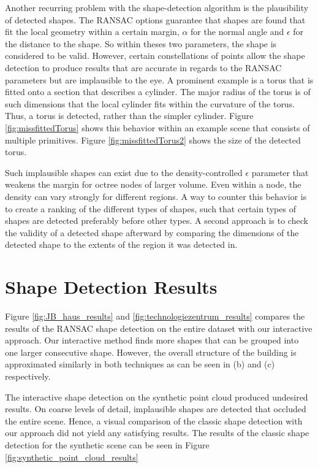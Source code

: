 Another recurring problem with the shape-detection algorithm is the plausibility of detected shapes. The RANSAC options guarantee that shapes are found that fit the local geometry within a certain margin, $\alpha$ for the normal angle and $\epsilon$ for the distance to the shape. So within theses two parameters, the shape is considered to be valid. However, certain constellations of points allow the shape detection to produce results that are accurate in regards to the RANSAC parameters but are implausible to the eye. A prominent example is a torus that is fitted onto a section that describes a cylinder. The major radius of the torus is of such dimensions that the local cylinder fits within the curvature of the torus. Thus, a torus is detected, rather than the simpler cylinder. Figure \ref{fig:missfittedTorus} shows this behavior within an example scene that consists of multiple primitives. Figure \ref{fig:missfittedTorus2} shows the size of the detected torus. 

\par

Such implausible shapes can exist due to the density-controlled $\epsilon$ parameter that weakens the margin for octree nodes of larger volume. Even within a node, the density can vary strongly for different regions. A way to counter this behavior is to create a ranking of the different types of shapes, such that certain types of shapes are detected preferably before other types. A second approach is to check the validity of a detected shape afterward by comparing the dimensions of the detected shape to the extents of the region it was detected in. 


\section{Shape Detection Results}
\label{sec:shape_detection_results}

Figure \ref{fig:JB_haus_results} and \ref{fig:technologiezentrum_results} compares the results of the RANSAC shape detection on the entire dataset with our interactive approach. Our interactive method finds more shapes that can be grouped into one larger consecutive shape. However, the overall structure of the building is approximated similarly in both techniques as can be seen in (b) and (c) respectively. 

The interactive shape detection on the synthetic point cloud produced undesired results. On coarse levels of detail, implausible shapes are detected that occluded the entire scene. Hence, a visual comparison of the classic shape detection with our approach did not yield any satisfying results. The results of the classic shape detection for the synthetic scene can be seen in Figure \ref{fig:synthetic_point_cloud_results}


